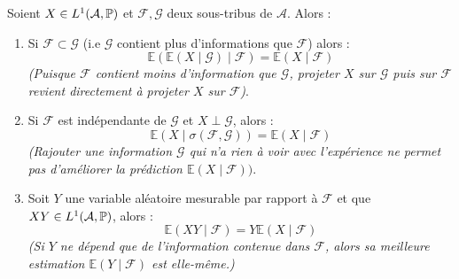 \begin{proposition}
    Soient $X \in L^1( \mathcal{A}, \mathbb{P})$ et $ \mathcal{F}, \mathcal{G} $ deux sous-tribus de 
    $ \mathcal{A}$. Alors : 
    \begin{enumerate}[label={\roman*)}]
        \item Si $ \mathcal{F} \subset \mathcal{G}$ (i.e $ \mathcal{G}$ contient plus d'informations 
            que $ \mathcal{F}$) alors : 
                $$ \mathbb{E}( \mathbb{E}(X \mid \mathcal{G} ) \mid \mathcal{F} ) = \mathbb{E}(X \mid \mathcal{F} )  $$
            \emph{(Puisque $ \mathcal{F}$ contient moins d'information que $ \mathcal{G}$, projeter $X$ sur 
            $ \mathcal{G}$ puis sur $ \mathcal{F}$ revient directement à projeter $X$ sur $ \mathcal{F}$)}. 
        \item Si $ \mathcal{F}$ est indépendante de $ \mathcal{G}$ et $X \perp \mathcal{G}$, alors : 
            $$ \mathbb{E}(X \mid \sigma( \mathcal{F}, \mathcal{G})) = \mathbb{E}(X \mid \mathcal{F}) $$ 
        \emph{(Rajouter une information $ \mathcal{G}$ qui n'a rien à voir avec l'expérience ne permet pas 
        d'améliorer la prédiction $ \mathbb{E}(X \mid \mathcal{F}))$}. 
    \item Soit $Y$ une variable aléatoire mesurable par rapport à $ \mathcal{F}$ et que 
        $ XY \in L^1( \mathcal{A}, \mathbb{P})$, alors : 
            $$ \mathbb{E}(XY \mid \mathcal{F}) = Y \mathbb{E}(X \mid \mathcal{F}) $$
        \emph{(Si $Y$ ne dépend que de l'information contenue dans $ \mathcal{F}$, alors 
        sa meilleure estimation $ \mathbb{E}(Y \mid \mathcal{F})$ est elle-même.)}
    \end{enumerate} 
\end{proposition}




